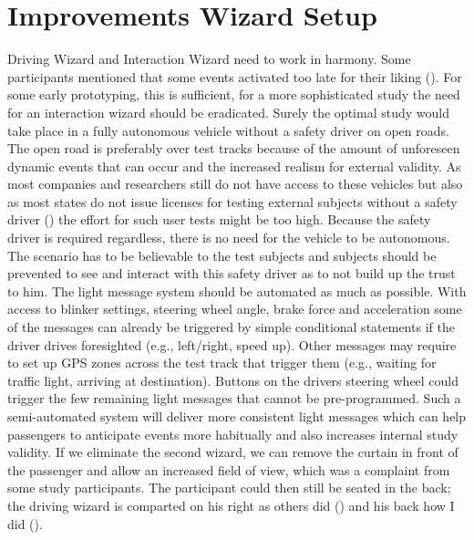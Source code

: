\section{Improvements Wizard Setup}
\label{ImproveWizard}
Driving Wizard and Interaction Wizard need to work in harmony. Some participants mentioned that some events activated too late for their liking (). For some early prototyping, this is sufficient, for a more sophisticated study the need for an interaction wizard should be eradicated. Surely the optimal study would take place in a fully autonomous vehicle without a safety driver on open roads. The open road is preferably over test tracks because of the amount of unforeseen dynamic events that can occur and the increased realism for external validity. As most companies and researchers still do not have access to these vehicles but also as most states do not issue licenses for testing external subjects without a safety driver () the effort for such user tests might be too high. Because the safety driver is required regardless, there is no need for the vehicle to be autonomous. The scenario has to be believable to the test subjects and subjects should be prevented to see and interact with this safety driver as to not build up the trust to him. The light message system should be automated as much as possible. With access to blinker settings, steering wheel angle, brake force and acceleration some of the messages can already be triggered by simple conditional statements if the driver drives foresighted (e.g., left/right, speed up). Other messages may require to set up GPS zones across the test track that trigger them (e.g., waiting for traffic light, arriving at destination). Buttons on the drivers steering wheel could trigger the few remaining light messages that cannot be pre-programmed. Such a semi-automated system will deliver more consistent light messages which can help passengers to anticipate events more habitually and also increases internal study validity. If we eliminate the second wizard, we can remove the curtain in front of the passenger and allow an increased field of view, which was a complaint from some study participants. The participant could then still be seated in the back; the driving wizard is comparted on his right as others did () and his back how I did ().  


